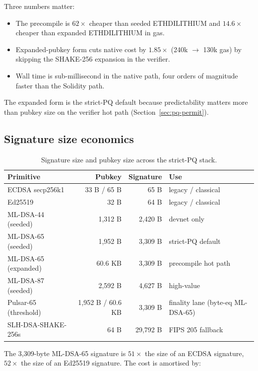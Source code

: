 Three numbers matter:

\begin{itemize}[leftmargin=2em,nosep]
  \item The precompile is $62\times$ cheaper than seeded ETHDILITHIUM and
    $14.6\times$ cheaper than expanded ETHDILITHIUM in gas.
  \item Expanded-pubkey form cuts native cost by $1.85\times$
    (240k $\to$ 130k gas) by skipping the SHAKE-256 expansion in the
    verifier.
  \item Wall time is sub-millisecond in the native path, four orders of
    magnitude faster than the Solidity path.
\end{itemize}

The expanded form is the strict-PQ default because predictability matters
more than pubkey size on the verifier hot path
(Section~\ref{sec:pq-permit}).

\subsection{Signature size economics}

\begin{table}[H]
\centering
\caption{Signature size and pubkey size across the strict-PQ stack.}
\label{tab:sig-sizes}
\begin{tabular}{lrrl}
\toprule
Primitive & Pubkey & Signature & Use \\
\midrule
ECDSA secp256k1     & 33 B / 65 B & 65 B   & legacy / classical \\
Ed25519             & 32 B        & 64 B   & legacy / classical \\
ML-DSA-44 (seeded)  & 1{,}312 B   & 2{,}420 B & devnet only \\
ML-DSA-65 (seeded)  & 1{,}952 B   & 3{,}309 B & strict-PQ default \\
ML-DSA-65 (expanded)& 60.6 KB     & 3{,}309 B & precompile hot path \\
ML-DSA-87 (seeded)  & 2{,}592 B   & 4{,}627 B & high-value \\
Pulsar-65 (threshold) & 1{,}952 B / 60.6 KB & 3{,}309 B & finality lane (byte-eq ML-DSA-65) \\
SLH-DSA-SHAKE-256s  & 64 B        & 29{,}792 B & FIPS 205 fallback \\
\bottomrule
\end{tabular}
\end{table}

The 3{,}309-byte ML-DSA-65 signature is $51\times$ the size of an ECDSA
signature, $52\times$ the size of an Ed25519 signature. The cost is
amortised by:

